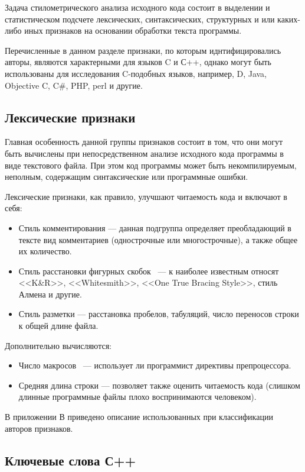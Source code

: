 Задача стилометрического анализа исходного кода состоит в выделении и статистическом подсчете 
лексических, синтаксических, структурных и или каких-либо иных признаков на основании
обработки текста программы.

Перечисленные в данном разделе признаки, по которым иднтифицировались авторы, являются характерными для языков C и С++, однако могут быть 
использованы для исследования C-подобных языков, например, D, Java, Objective C, C\#, PHP, perl и другие.

\subsection{Лексические признаки}

Главная особенность данной группы признаков состоит в том, что они могут быть вычислены при 
непосредственном анализе исходного кода программы в виде текстового файла. 
При этом код программы может быть некомпилируемым, неполным, содержащим
синтаксические или программные ошибки.

Лексические признаки, как правило, улучшают читаемость кода и включают в себя:

\begin{itemize}
 \item Стиль комментирования --- данная подгруппа определяет преобладающий в тексте вид комментариев 
 (однострочные или многострочные), а также общее их количество.
 \item Стиль расстановки фигурных скобок~\cite{bracing_styles} --- к наиболее известным относят <<K\&R>>, <<Whitesmith>>,
 <<One True Bracing Style>>, стиль Алмена и другие. 
 \item Стиль разметки --- расстановка пробелов, табуляций, число переносов строки к общей длине файла.
\end{itemize}


Дополнительно вычисляются:
\begin{itemize}
 \item Число макросов~\cite{macros} --- использует ли программист директивы препроцессора.
 \item Средняя длина строки --- позволяет также оценить читаемость кода (слишком длинные программные файлы
 плохо воспринимаются человеком).
\end{itemize}


В приложении В приведено описание использованных при классификации авторов 
признаков.

\subsection{Ключевые слова С++}\label{keycpp}

